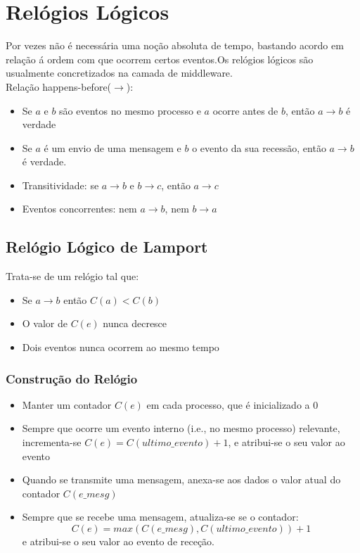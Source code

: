 \documentclass[10pt,a4paper]{report}
\begin{document}
\section{Relógios Lógicos}
Por vezes não é necessária uma noção absoluta de tempo, bastando acordo em relação á ordem com que ocorrem certos eventos.Os relógios lógicos são usualmente concretizados na camada de middleware.\\
Relação happens-before($\rightarrow$):
\begin{itemize}
\item Se $a$ e $b$ são eventos no mesmo processo e $a$ ocorre antes de $b$, então $a \rightarrow b$ é verdade
\item Se $a$ é um envio de uma mensagem e $b$ o evento da sua recessão, então $a \rightarrow b$ é verdade.
\item Transitividade: se $a \rightarrow b$ e $b \rightarrow c$, então $a \rightarrow c$
\item Eventos concorrentes: nem $a \rightarrow b$, nem $b \rightarrow a$
\end{itemize}
\subsection{Relógio Lógico de Lamport}
Trata-se de um relógio tal que:
\begin{itemize}
\item Se $a \rightarrow b$ então $C(a) < C(b)$
\item O valor de $C(e)$ nunca decresce
\item Dois eventos nunca ocorrem ao mesmo tempo
\end{itemize}
\subsubsection{Construção do Relógio}
\begin{itemize}
\item Manter um contador $C(e)$ em cada processo, que é inicializado a 0
\item Sempre que ocorre um evento interno (i.e., no mesmo processo) relevante, incrementa-se $C(e) = C(ultimo\_evento) + 1$, e atribui-se o seu valor ao evento
\item Quando se transmite uma mensagem, anexa-se aos dados o valor atual do
contador $C(e\_mesg)$
\item Sempre que se recebe uma mensagem, atualiza-se se o contador:
$$
C(e) = max(C(e\_mesg), C(ultimo\_evento)) +1
$$
e atribui-se o seu valor ao evento de receção.
\end{itemize}
\end{document}
